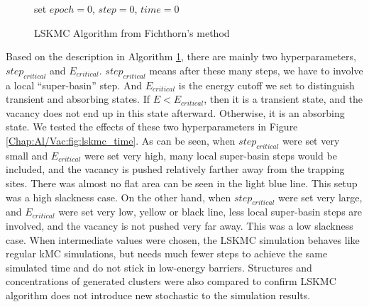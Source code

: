 \begin{figure}[!htb]
  \centering
  \begin{minipage}{.75\linewidth}
    \begin{algorithm}[H]
      \caption{\acf{LSKMC} Algorithm from  Fichthorn's method \cite{fichthorn2013local}}\label{algo:lskmc}
      \begin{algorithmic}[1]
        \State set $epoch = 0$, $step = 0$, $time = 0$
        \Else
        \EndIf
        \EndIf

        \EndWhile
      \end{algorithmic}
    \end{algorithm}
  \end{minipage}
\end{figure}


Based on the description in Algorithm \ref{algo:lskmc}, there are mainly two hyperparameters, $step_{critical}$ and $E_{critical}$. $step_{critical}$ means after these many steps, we have to involve a local ``super-basin'' step. And $E_{critical}$ is the energy cutoff we set to distinguish transient and absorbing states. If $E < E_{critical}$, then it is a transient state, and the vacancy does not end up in this state afterward. Otherwise, it is an absorbing state. We tested the effects of these two hyperparameters in Figure \ref{Chap:Al/Vac:fig:lskmc_time}. As can be seen, when $step_{critical}$ were set very small and $E_{critical}$ were set very high, many local super-basin steps would be included, and the vacancy is pushed relatively farther away from the trapping sites. There was almost no flat area can be seen in the light blue line. This setup was a high slackness case. On the other hand, when $step_{critical}$ were set very large, and $E_{critical}$ were set very low, yellow or black line, less local super-basin steps are involved, and the vacancy is not pushed very far away. This was a low slackness case. When intermediate values were chosen, the \ac{LSKMC} simulation behaves like regular \ac{kMC} simulations, but needs much fewer steps to achieve the same simulated time and do not stick in low-energy barriers.  Structures and concentrations of generated clusters were also compared to confirm \ac{LSKMC} algorithm does not introduce new stochastic to the simulation results.

